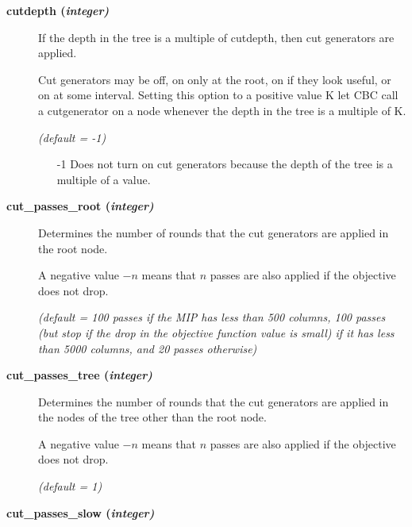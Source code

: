 \begin{description}


\item[\label{cutdepth}\hypertarget{cutdepth}
{\textbf{cutdepth (\slshape{integer})}}]\hspace{1.0in}

If the depth in the tree is a multiple of cutdepth, then cut generators are applied.

Cut generators may be off, on only at the root, on if they look useful, or on at some interval.
Setting this option to a positive value K let CBC call a cutgenerator on a node whenever the depth in the tree is a multiple of K.

\textsl{(default = -1)}
\begin{itemize}
\item[-1]
Does not turn on cut generators because the depth of the tree is a multiple of a value.
\end{itemize}

\item[\label{cut_passes_root}\hypertarget{cut_passes_root}
{\textbf{cut\_passes\_root (\slshape{integer})}}]\hspace{1.0in}

Determines the number of rounds that the cut generators are applied in the root node.

A negative value $-n$ means that $n$ passes are also applied if the objective does not drop.

\textsl{(default = 100 passes if the MIP has less than 500 columns, 100 passes (but stop if the drop in the objective function value is small) if it has less than 5000 columns, and 20 passes otherwise)}


\item[\label{cut_passes_tree}\hypertarget{cut_passes_tree}
{\textbf{cut\_passes\_tree (\slshape{integer})}}]\hspace{1.0in}

Determines the number of rounds that the cut generators are applied in the nodes of the tree other than the root node.

A negative value $-n$ means that $n$ passes are also applied if the objective does not drop.

\textsl{(default = 1)}

\item[\label{cut_passes_slow}\hypertarget{cut_passes_slow}
{\textbf{cut\_passes\_slow (\slshape{integer})}}]\hspace{1.0in}


\end{description}

